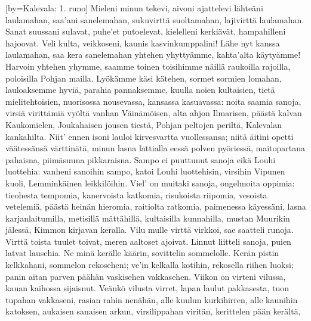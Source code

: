 [by={Kalevala: 1. runo}]
  \beginverse
    Mieleni minun tekevi,
    aivoni ajattelevi
    lähteäni laulamahan,
    saa'ani sanelemahan,
    sukuvirttä suoltamahan,
    lajivirttä laulamahan.
    Sanat suussani sulavat,
    puhe'et putoelevat,
    kielelleni kerkiävät,
    hampahilleni hajoovat.
    Veli kulta, veikkoseni,
    kaunis kasvinkumppalini!
    Lähe nyt kanssa laulamahan,
    saa kera sanelemahan
    yhtehen yhyttyämme,
    kahta'alta käytyämme!
    Harvoin yhtehen yhymme,
    saamme toinen toisihimme
    näillä raukoilla rajoilla,
    poloisilla Pohjan mailla.
  \endverse
  \beginverse
    Lyökämme käsi kätehen,
    sormet sormien lomahan,
    lauloaksemme hyviä,
    parahia pannaksemme,
    kuulla noien kultaisien,
    tietä mielitehtoisien,
    nuorisossa nousevassa,
    kansassa kasuavassa:
    noita saamia sanoja,
    virsiä virittämiä
    vyöltä vanhan Väinämöisen,
    alta ahjon Ilmarisen,
    päästä kalvan Kaukomielen,
    Joukahaisen jousen tiestä,
    Pohjan peltojen periltä,
    Kalevalan kankahilta.
    Niit' ennen isoni lauloi
    kirvesvartta vuollessansa;
    niitä äitini opetti
    väätessänsä värttinätä,
    minun lasna lattialla
    eessä polven pyöriessä,
    maitopartana pahaisna,
    piimäsuuna pikkaraisna.
    Sampo ei puuttunut sanoja
    eikä Louhi luottehia:
    vanheni sanoihin sampo,
    katoi Louhi luottehisin,
    virsihin Vipunen kuoli,
    Lemminkäinen leikkilöihin.
  \endverse
  \beginverse
    Viel' on muitaki sanoja,
    ongelmoita oppimia:
    tieohesta tempomia,
    kanervoista katkomia,
    risukoista riipomia,
    vesoista vetelemiä,
    päästä heinän hieromia,
    raitiolta ratkomia,
    paimenessa käyessäni,
    lasna karjanlaitumilla,
  \endverse
  \beginverse
    metisillä mättähillä,
    kultaisilla kunnahilla,
    mustan Muurikin jälessä,
    Kimmon kirjavan keralla.
    Vilu mulle virttä virkkoi,
    sae saatteli runoja.
    Virttä toista tuulet toivat,
    meren aaltoset ajoivat.
    Linnut liitteli sanoja,
    puien latvat lausehia.
    Ne minä kerälle käärin,
    sovittelin sommelolle.
    Kerän pistin kelkkahani,
    sommelon rekoseheni;
    ve'in kelkalla kotihin,
    rekosella riihen luoksi;
    panin aitan parven päähän
    vaskisehen vakkasehen.
    Viikon on virteni vilussa,
    kauan kaihossa sijaisnut.
  \endverse
  \beginverse
    Veänkö vilusta virret,
    lapan laulut pakkasesta,
    tuon tupahan vakkaseni,
    rasian rahin nenähän,
    alle kuulun kurkihirren,
    alle kaunihin katoksen,
    aukaisen sanaisen arkun,
    virsilippahan viritän,
    kerittelen pään kerältä,
